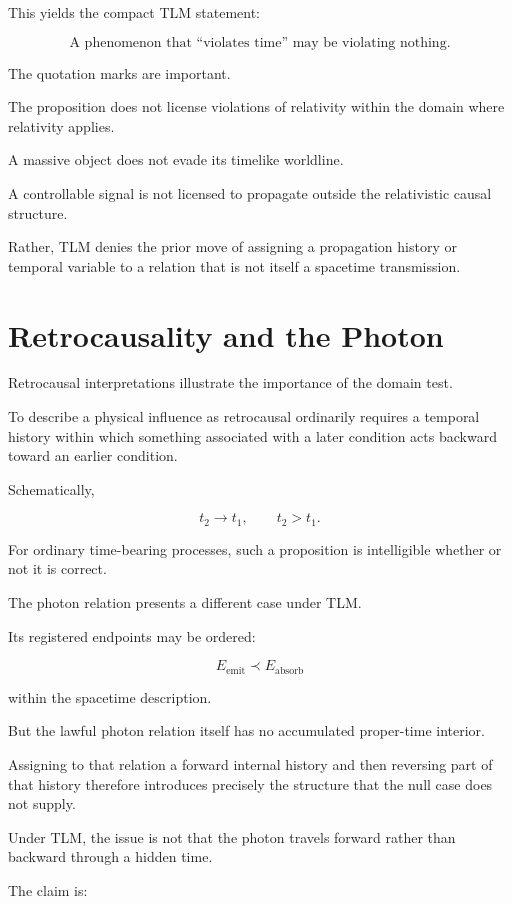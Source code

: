 \documentclass[12pt,onecolumn]{article}
\theoremstyle{plain}
\theoremstyle{definition}
\theoremstyle{remark}
\begin{document}
This yields the compact TLM statement:

\[
\boxed{
\text{A phenomenon that ``violates time'' may be violating nothing.}
}
\]

The quotation marks are important.

The proposition does not license violations of relativity within the domain
where relativity applies.

A massive object does not evade its timelike worldline.

A controllable signal is not licensed to propagate outside the relativistic
causal structure.

Rather, TLM denies the prior move of assigning a propagation history or
temporal variable to a relation that is not itself a spacetime
transmission.


\section{Retrocausality and the Photon}

Retrocausal interpretations illustrate the importance of the domain test.

To describe a physical influence as retrocausal ordinarily requires a
temporal history within which something associated with a later condition
acts backward toward an earlier condition.

Schematically,

\[
t_2 \longrightarrow t_1,
\qquad t_2>t_1.
\]

For ordinary time-bearing processes, such a proposition is intelligible
whether or not it is correct.

The photon relation presents a different case under TLM.

Its registered endpoints may be ordered:

\[
E_{\mathrm{emit}}
\prec
E_{\mathrm{absorb}}
\]

within the spacetime description.

But the lawful photon relation itself has no accumulated proper-time
interior.

Assigning to that relation a forward internal history and then reversing
part of that history therefore introduces precisely the structure that the
null case does not supply.

Under TLM, the issue is not that the photon travels forward rather than
backward through a hidden time.

The claim is:
\end{document}
